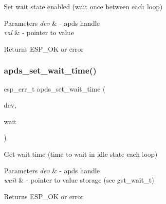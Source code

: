 \begin{DoxyItemize}
\item Set wait state enabled (wait once between each loop) 
\end{DoxyItemize}


\begin{DoxyParams}{Parameters}
{\em dev} & -\/ apds handle \\
\hline
{\em val} & -\/ pointer to value \\
\hline
\end{DoxyParams}
\begin{DoxyReturn}{Returns}
E\+S\+P\+\_\+\+OK or error 
\end{DoxyReturn}
\mbox{\label{group__APDS9960__GeneralFunctions_gabf6c5a724f584dd63d25871845c899ea}} 
\subsubsection{\texorpdfstring{apds\+\_\+set\+\_\+wait\+\_\+time()}{apds\_set\_wait\_time()}}
{\footnotesize\ttfamily esp\+\_\+err\+\_\+t apds\+\_\+set\+\_\+wait\+\_\+time (\begin{DoxyParamCaption}\item[{\hyperlink{structAPDS9960__Driver}{A\+P\+D\+S\+\_\+\+D\+EV}}]{dev,  }\item[{\hyperlink{vl53l0x__types_8h_aba7bc1797add20fe3efdf37ced1182c5}{uint8\+\_\+t} $\ast$}]{wait }\end{DoxyParamCaption})}




\begin{DoxyItemize}
\item Get wait time (time to wait in idle state each loop) 
\end{DoxyItemize}


\begin{DoxyParams}{Parameters}
{\em dev} & -\/ apds handle \\
\hline
{\em wait} & -\/ pointer to value storage (see gst\+\_\+wait\+\_\+t) \\
\hline
\end{DoxyParams}
\begin{DoxyReturn}{Returns}
E\+S\+P\+\_\+\+OK or error 
\end{DoxyReturn}
